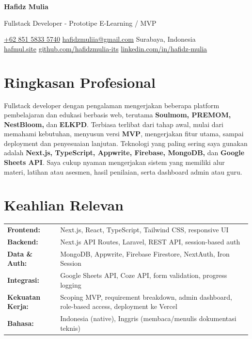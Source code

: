 \documentclass[a4paper,11pt]{article}
\newcommand{\cvname}[1]{%
  {\centering\LARGE\bfseries #1\par\vspace{2pt}}%
}
\newcommand{\cvtitle}[1]{%
  {\centering\large\color{accent} #1\par\vspace{4pt}}%
}
\newcommand{\cvcontact}[1]{%
  {\centering\small #1\par\vspace{6pt}}%
}
\begin{document}
\cvname{Hafidz Mulia}
\cvtitle{Fullstack Developer - Prototipe E-Learning / MVP}
\cvcontact{%
  \href{tel:+6285158335740}{+62 851 5833 5740} \quad\textbar\quad
  \href{mailto:hafidzmuliia@gmail.com}{hafidzmuliia@gmail.com} \quad\textbar\quad
  Surabaya, Indonesia \\
  \href{https://hafmul.site}{hafmul.site} \quad\textbar\quad
  \href{https://github.com/hafidzmulia-its}{github.com/hafidzmulia-its} \quad\textbar\quad
  \href{https://www.linkedin.com/in/hafidz-mulia/}{linkedin.com/in/hafidz-mulia}
}

\section{Ringkasan Profesional}
Fullstack developer dengan pengalaman mengerjakan beberapa platform pembelajaran dan edukasi berbasis web, terutama \textbf{Soulmom, PREMOM, NestBloom,} dan \textbf{ELKPD}. Terbiasa terlibat dari tahap awal, mulai dari memahami kebutuhan, menyusun versi \textbf{MVP}, mengerjakan fitur utama, sampai deployment dan penyesuaian lanjutan. Teknologi yang paling sering saya gunakan adalah \textbf{Next.js, TypeScript, Appwrite, Firebase, MongoDB,} dan \textbf{Google Sheets API}. Saya cukup nyaman mengerjakan sistem yang memiliki alur materi, latihan atau asesmen, hasil penilaian, serta dashboard admin atau guru.

\section{Keahlian Relevan}
\begin{tabularx}{\textwidth}{@{}l X@{}}
\textbf{Frontend:} & Next.js, React, TypeScript, Tailwind CSS, responsive UI \\[3pt]
\textbf{Backend:} & Next.js API Routes, Laravel, REST API, session-based auth \\[3pt]
\textbf{Data \& Auth:} & MongoDB, Appwrite, Firebase Firestore, NextAuth, Iron Session \\[3pt]
\textbf{Integrasi:} & Google Sheets API, Coze API, form validation, progress logging \\[3pt]
\textbf{Kekuatan Kerja:} & Scoping MVP, requirement breakdown, admin dashboard, role-based access, deployment ke Vercel \\[3pt]
\textbf{Bahasa:} & Indonesia (native), Inggris (membaca/menulis dokumentasi teknis) \\
\end{tabularx}
\end{document}
